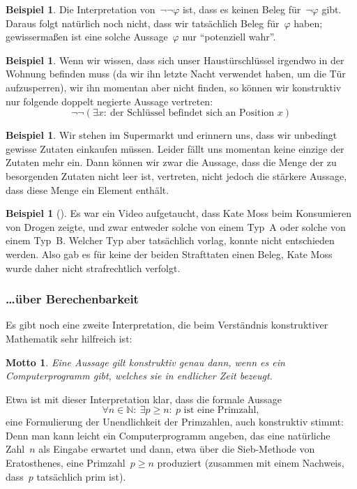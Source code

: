 \documentclass[a4paper,ngerman,12pt]{scrartcl}
\theoremstyle{definition}
\newtheorem{bsp}[defn]{Beispiel}
\theoremstyle{plain}
\newtheorem{motto}[defn]{Motto}
\theoremstyle{remark}
\newcommand{\NN}{\mathbb{N}}
\renewcommand{\_}{\mathpunct{.}\,}
\newcommand{\?}{\,{:}\,}
\begin{document}
\begin{bsp}
Die Interpretation von~$\neg\neg\varphi$ ist, dass es keinen Beleg
für~$\neg\varphi$ gibt. Daraus folgt natürlich noch nicht, dass wir tatsächlich
Beleg für~$\varphi$ haben; gewissermaßen ist eine solche Aussage~$\varphi$ nur
"`potenziell wahr"'.
\end{bsp}

\begin{bsp}Wenn wir wissen, dass sich unser Haustürschlüssel irgendwo in der
Wohnung befinden muss (da wir ihn letzte Nacht verwendet haben, um die Tür
aufzusperren), wir ihn momentan aber nicht finden, so können wir konstruktiv
nur folgende doppelt negierte Aussage vertreten:
\[ \neg\neg (\exists x{:}\ \text{der Schlüssel befindet sich an Position~$x$})
\]
\end{bsp}

\begin{bsp}Wir stehen im Supermarkt und erinnern uns, dass wir unbedingt
gewisse Zutaten einkaufen müssen. Leider fällt uns momentan keine einzige der
Zutaten mehr ein. Dann können wir zwar die Aussage, dass die Menge der zu
besorgenden Zutaten nicht leer ist, vertreten, nicht jedoch die stärkere
Aussage, dass diese Menge ein Element enthält.\end{bsp}

\begin{bsp}[\cite{sigfpe:katemoss,bbc:katemoss}]
Es war ein Video aufgetaucht, dass Kate Moss beim Konsumieren von Drogen zeigte,
und zwar entweder solche von einem Typ~A oder solche von einem Typ~B. Welcher
Typ aber tatsächlich vorlag, konnte nicht entschieden werden. Also gab es für
keine der beiden Strafttaten einen Beleg, Kate Moss wurde daher nicht
strafrechtlich verfolgt.
\end{bsp}


\subsubsection*{\ldots über Berechenbarkeit}

Es gibt noch eine zweite Interpretation, die beim Verständnis konstruktiver
Mathematik sehr hilfreich ist:
\begin{motto}Eine Aussage gilt konstruktiv genau dann, wenn es ein
Computerprogramm gibt, welches sie in endlicher Zeit bezeugt.\end{motto}
Etwa ist mit dieser Interpretation klar, dass die formale Aussage
\[ \forall n \in \NN{:}\ \exists p \geq n{:}\ \text{$p$ ist eine Primzahl}, \]
eine Formulierung der Unendlichkeit der Primzahlen, auch konstruktiv
stimmt: Denn man kann leicht ein Computerprogramm angeben, das eine natürliche
Zahl~$n$ als Eingabe erwartet und dann, etwa über die Sieb-Methode von
Eratosthenes, eine Primzahl~$p \geq n$ produziert (zusammen mit einem Nachweis,
dass~$p$ tatsächlich prim ist).
\end{document}
